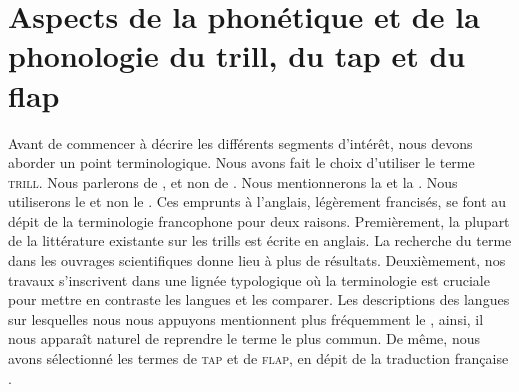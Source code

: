 \section{Aspects de la phonétique et de la phonologie du trill, du tap et du flap}

Avant de commencer à décrire les différents segments d'intérêt, nous devons aborder un point terminologique.
Nous avons fait le choix d'utiliser le terme \textsc{trill}. Nous parlerons de , et non de . Nous mentionnerons la  et la . Nous utiliserons le  et non le . Ces emprunts à l'anglais, légèrement francisés, se font au dépit de la terminologie francophone pour deux raisons. Premièrement, la plupart de la littérature existante sur les trills est écrite en anglais. La recherche du terme  dans les ouvrages scientifiques donne lieu à plus de résultats. Deuxièmement, nos travaux s'inscrivent dans une lignée typologique où la terminologie est cruciale pour mettre en contraste les langues et les comparer. Les descriptions des langues sur lesquelles nous nous appuyons mentionnent plus fréquemment le , ainsi, il nous apparaît naturel de reprendre le terme le plus commun. De même, nous avons sélectionné les termes de \textsc{tap} et de \textsc{flap}, en dépit de la traduction française .

